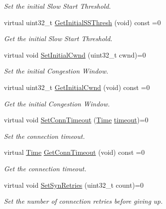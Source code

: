 \begin{DoxyCompactItemize}
\begin{DoxyCompactList}\small\item\em Set the initial Slow Start Threshold. \end{DoxyCompactList}\item 
virtual uint32\+\_\+t \hyperlink{classns3_1_1TcpSocket_a5536c0feb21d1f0e555cf1f7725e14a4}{Get\+Initial\+S\+S\+Thresh} (void) const =0
\begin{DoxyCompactList}\small\item\em Get the initial Slow Start Threshold. \end{DoxyCompactList}\item 
virtual void \hyperlink{classns3_1_1TcpSocket_ae2dbd6d7ffcfc063fc0b84c8b517d74b}{Set\+Initial\+Cwnd} (uint32\+\_\+t cwnd)=0
\begin{DoxyCompactList}\small\item\em Set the initial Congestion Window. \end{DoxyCompactList}\item 
virtual uint32\+\_\+t \hyperlink{classns3_1_1TcpSocket_adeb7fef4213315f2c743ab7ac22ec2d3}{Get\+Initial\+Cwnd} (void) const =0
\begin{DoxyCompactList}\small\item\em Get the initial Congestion Window. \end{DoxyCompactList}\item 
virtual void \hyperlink{classns3_1_1TcpSocket_acde1dd61f9790c1e4d9faff352d7c4a8}{Set\+Conn\+Timeout} (\hyperlink{classns3_1_1Time}{Time} \hyperlink{openflow-switch_8cc_a386d174ae121d1cfa279074b7e209714}{timeout})=0
\begin{DoxyCompactList}\small\item\em Set the connection timeout. \end{DoxyCompactList}\item 
virtual \hyperlink{classns3_1_1Time}{Time} \hyperlink{classns3_1_1TcpSocket_ac1071340de41405b7984fd4174e87bbb}{Get\+Conn\+Timeout} (void) const =0
\begin{DoxyCompactList}\small\item\em Get the connection timeout. \end{DoxyCompactList}\item 
virtual void \hyperlink{classns3_1_1TcpSocket_af2f2e8f1d0cd533e5dde58ef68c1774a}{Set\+Syn\+Retries} (uint32\+\_\+t count)=0
\begin{DoxyCompactList}\small\item\em Set the number of connection retries before giving up. \end{DoxyCompactList}\item 

\end{DoxyCompactItemize}
